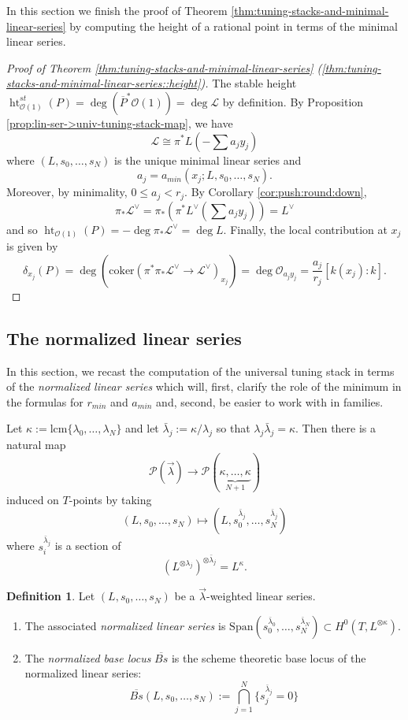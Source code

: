 \documentclass[a4paper,12pt]{amsart}
\theoremstyle{definition}
\newtheorem{defn}[thm]{Definition}
\newcommand{\cO}{\mathcal{O}}
\newcommand{\cL}{\mathcal{L}}
\DeclareMathOperator{\height}{ht}
\newcommand{\blambda}{\bar{\lambda}}
\newcommand{\Pcv}{\mathcal{P}(\vec{\lambda})}
\newcommand{\Pc}{\mathcal{P}}
\newcommand{\lambdavec}{{\vec{\lambda}}}
\begin{document}
	In this section we finish the proof of Theorem \ref{thm:tuning-stacks-and-minimal-linear-series} by computing the height of a rational point in terms of the minimal linear series. 
	
	\begin{proof}[{Proof of Theorem \ref{thm:tuning-stacks-and-minimal-linear-series} (\ref{thm:tuning-stacks-and-minimal-linear-series::height})}]
		The stable height $\height^{st}_{\cO(1)}(P) = \deg(\overline{P}^*\cO(1)) = \deg \cL$ by definition. By Proposition \ref{prop:lin-ser->univ-tuning-stack-map}, we have
		$$
		\cL \cong \pi^*L(-\sum a_j y_j)
		$$
		where $(L, s_0, \ldots, s_N)$ is the unique minimal linear series and $$a_j = a_{min}(x_j;L, s_0,\ldots,s_N).$$ Moreover, by minimality, $0 \le a_j < r_j$. By Corollary \ref{cor:push:round:down}, 
		$$
		\pi_*\cL^{\vee} = \pi_*\left(\pi^*L^{\vee}\left(\sum a_j y_j\right)\right) = L^{\vee}
		$$
		and so $\height_{\cO(1)}(P) = -\deg \pi_*\cL^{\vee} = \deg L$. Finally, the local contribution at $x_j$ is given by 
		$$
		\delta_{x_j}(P) = \deg \left(\mathrm{coker}(\pi^*\pi_*\cL^{\vee} \to \cL^{\vee})_{x_j}\right) = \deg \cO_{a_jy_j} = \frac{a_j}{r_j}[k(x_j):k]. 
		$$
	\end{proof}
	
	\subsection{The normalized linear series}\label{sec:normalized}  
	
	In this section, we recast the computation of the universal tuning stack in terms of the \emph{normalized linear series} which will, first, clarify the role of the minimum in the formulas for $r_{min}$ and $a_{min}$ and, second, be easier to work with in families. 
	
	Let $\kappa := \mathrm{lcm}\{\lambda_0, \ldots, \lambda_N\}$ and let $\bar{\lambda}_j := \kappa/\lambda_j$ so that $\lambda_j \bar{\lambda}_j = \kappa$. Then there is a natural map 
	$$
	\Pcv \to \Pc(\underbrace{\kappa, \ldots, \kappa}_{N+1})
	$$
	induced on $T$-points by taking
	$$
	(L, s_0, \ldots, s_N) \mapsto (L, s_0^{\bar{\lambda}_j}, \ldots, s_N^{\bar{\lambda}_j})
	$$
	where $s_i^{\bar{\lambda}_j}$ is a section of 
	$$
	(L^{\otimes \lambda_j})^{\otimes \bar{\lambda}_j} = L^{\kappa}. 
	$$
	\begin{defn} Let $(L, s_0, \ldots, s_N)$ be a $\lambdavec$-weighted linear series. 
		\begin{enumerate}[(1)]
			\item The associated \emph{normalized linear series} is $\mathrm{Span}(s_0^{\blambda_0}, \ldots, s_N^{\blambda_N}) \subset H^0(T, L^{\otimes \kappa})$. 
			\item The \emph{normalized base locus} $\overline{Bs}$ is the scheme theoretic base locus of the normalized linear series:
			$$
			\overline{Bs}(L, s_0, \ldots, s_N) := \bigcap_{j = 1}^N \{s_j^{\blambda_j} = 0\}
			$$
		\end{enumerate}
	\end{defn} 
	
\end{document}

